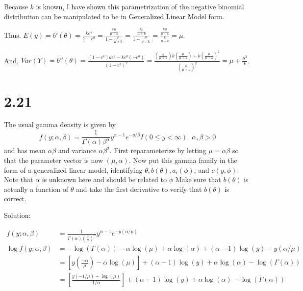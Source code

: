 \documentclass[
  letterpaper,
  DIV=11,
  numbers=noendperiod]{scrreprt}
\begin{document}
Because \(k\) is known, I have shown this parametrization of the
negative binomial distribution can be manipulated to be in Generalized
Linear Model form.

Thus,
\(E(y) = b'(\theta) = \frac{ke^{\theta}}{1-e^\theta} = \frac{\frac{k\mu}{\mu+k}}{1- \frac{\mu}{\mu+k}} = \frac{\frac{k\mu}{\mu+k}}{1- \frac{\mu}{\mu+k}}= \frac{\frac{k\mu}{\mu+k}}{\frac{k}{\mu+k}}= \mu\).

And,
\(Var(Y)= b''(\theta)= \frac{(1-e^\theta)ke^\theta - ke^\theta(-e^\theta)}{(1-e^\theta)^2}= \frac{\left(\frac{k}{\mu+k}\right)k\left(\frac{\mu}{\mu+k}\right)+ k\left(\frac{\mu}{\mu+k}\right)^2}{\left(\frac{k}{\mu+k}\right)^2}= \mu+ \frac{\mu^2}{k}\).

\newpage

\hypertarget{section-7}{%
\section{2.21}\label{section-7}}

The usual gamma density is given by
\[f(y;\alpha,\beta) = \frac{1}{\Gamma (\alpha)\beta^\alpha}y^{\alpha-1}e^{-y/\beta} I(0 \leq y < \infty) ~~~ \alpha,\beta>0\]
and has mean \(\alpha \beta\) and variance \(\alpha \beta^2\). First
reparameterize by letting \(\mu= \alpha \beta\) so that the parameter
vector is now \((\mu, \alpha)\). Now put this gamma family in the form
of a generalized linear model, identifying
\(\theta, b(\theta), a_i(\phi)\), and \(c(y,\phi)\). Note that
\(\alpha\) is unknown here and should be related to \(\phi\) Make sure
that \(b(\theta)\) is actually a function of \(\theta\) and take the
first derivative to verify that \(b(\theta)\) is correct.

Solution:

\[\begin{aligned}
f(y;\alpha,\beta) &= \frac{1}{\Gamma (\alpha)\left(\frac{\mu}{\alpha}\right)^\alpha}y^{\alpha-1}e^{-y (\alpha/\mu)} \\
\log f(y;\alpha,\beta) &= -\log \left(\Gamma (\alpha) \right) -\alpha \log (\mu) +\alpha \log(\alpha)+ (\alpha-1) \log(y) -y (\alpha/\mu) \\
&= \left[y \left(\frac{-\alpha}{\mu} \right) -\alpha \log (\mu) \right]  +(\alpha-1)\log(y)+\alpha \log(\alpha)-\log \left(\Gamma (\alpha) \right)  \\
&= \left[ \frac{y(-1/\mu)- \log (\mu)}{1/\alpha} \right]  +(\alpha-1)\log(y)+\alpha \log(\alpha)-\log \left(\Gamma (\alpha) \right)  \\
\end{aligned}\]
\end{document}
